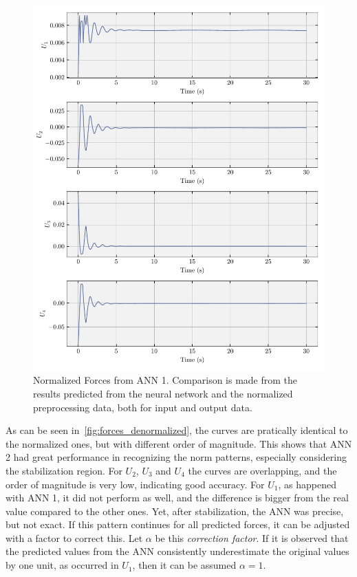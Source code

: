 \begin{figure}[!htb]
    \centering
    \caption[Normalized Forces from ANN 1]{Normalized Forces from ANN 1. Comparison is made from the results predicted from the neural network and the normalized preprocessing data, both for input and output data.}
    \includegraphics{../codes/models/model_alpha/figures/normalized_forces.pdf}

    \label{fig:forces_normalized}
\end{figure}

As can be seen in~\cref{fig:forces_denormalized}, the curves are pratically identical to the normalized ones, but with different order of magnitude.
This shows that ANN 2 had great performance in recognizing the norm patterns, especially considering the stabilization region.
For \(U_2\), \(U_3\) and \(U_4\) the curves are overlapping, and the order of magnitude is very low, indicating good accuracy.
For \(U_1\), as happened with ANN 1, it did not perform as well, and the difference is bigger from the real value compared to the other ones. Yet, after stabilization, the ANN was precise, but not exact. 
If this pattern continues for all predicted forces, it can be adjusted with a factor to correct this.
Let \(\alpha\) be this \emph{correction factor}. 
If it is observed that the predicted values from the ANN consistently underestimate the original values by one unit, as occurred in \(U_1\), then it can be assumed \(\alpha = 1\).

